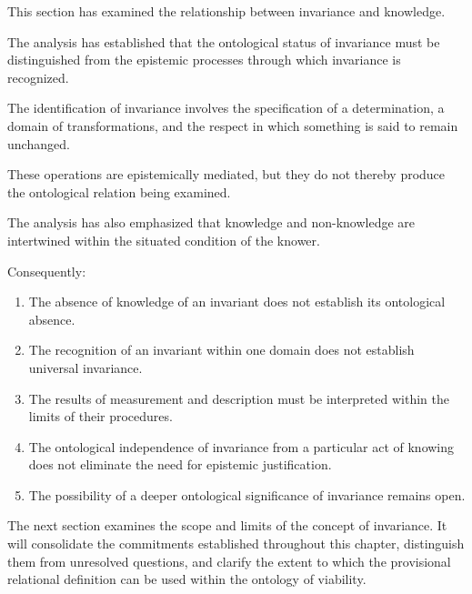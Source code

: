 This section has examined
the relationship between
invariance and knowledge.

The analysis has established
that the ontological status
of invariance must be
distinguished from the
epistemic processes through
which invariance is recognized.

The identification of invariance
involves the specification
of a determination, a domain
of transformations, and the
respect in which something
is said to remain unchanged.

These operations are epistemically
mediated, but they do not
thereby produce the ontological
relation being examined.

The analysis has also emphasized
that knowledge and non-knowledge
are intertwined within the
situated condition of the
knower.

Consequently:

\begin{enumerate}
    \item The absence of knowledge
    of an invariant does not
    establish its ontological
    absence.

    \item The recognition of
    an invariant within one
    domain does not establish
    universal invariance.

    \item The results of
    measurement and description
    must be interpreted within
    the limits of their
    procedures.

    \item The ontological
    independence of invariance
    from a particular act
    of knowing does not
    eliminate the need for
    epistemic justification.

    \item The possibility of
    a deeper ontological
    significance of invariance
    remains open.
\end{enumerate}

The next section examines
the scope and limits of
the concept of invariance.
It will consolidate the
commitments established
throughout this chapter,
distinguish them from
unresolved questions, and
clarify the extent to which
the provisional relational
definition can be used
within the ontology of
viability.

